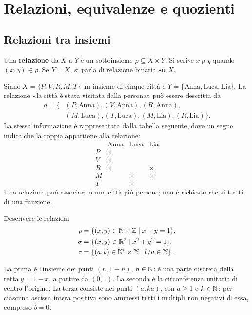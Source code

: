 \chapter{Relazioni, equivalenze e quozienti}

\section{Relazioni tra insiemi}
\begin{definizione}
Una \textbf{relazione} da $X$ a $Y$ è un sottoinsieme $\rho\subseteq X\times Y$. Si scrive $x\mathrel\rho y$ quando $(x,y)\in\rho$. Se $Y=X$, si parla di relazione binaria \textbf{su} $X$.
\end{definizione}

\begin{esempio}
Siano $X=\{P,V,R,M,T\}$ un insieme di cinque città e $Y=\{\text{Anna},\text{Luca},\text{Lia}\}$. La relazione «la città è stata visitata dalla persona» può essere descritta da
\[
\begin{split}
\rho=\{&(P,\text{Anna}),(V,\text{Anna}),(R,\text{Anna}),\\
       &(M,\text{Luca}),(T,\text{Luca}),(M,\text{Lia}),(R,\text{Lia})\}.
\end{split}
\]
La stessa informazione è rappresentata dalla tabella seguente, dove un segno indica che la coppia appartiene alla relazione:
\[
\begin{array}{c|ccc}
&\text{Anna}&\text{Luca}&\text{Lia}\\\hline
P&\times&&\\V&\times&&\\R&\times&&\times\\M&&\times&\times\\T&&\times&
\end{array}
\]
Una relazione può associare a una città più persone; non è richiesto che si tratti di una funzione.
\end{esempio}

\begin{esercizio}
Descrivere le relazioni
\[
\begin{aligned}
\rho&=\{(x,y)\in\mathbb{N}\times\mathbb{Z}\mid x+y=1\},\\
\sigma&=\{(x,y)\in\mathbb{R}^2\mid x^2+y^2=1\},\\
\tau&=\{(a,b)\in\mathbb{N}^*\times\mathbb{N}\mid b/a\in\mathbb{N}\}.
\end{aligned}
\]
\end{esercizio}
\begin{svolgimento}
La prima è l'insieme dei punti $(n,1-n)$, $n\in\mathbb{N}$: è una parte discreta della retta $y=1-x$, a partire da $(0,1)$. La seconda è la circonferenza unitaria di centro l'origine. La terza consiste nei punti $(a,ka)$, con $a\ge1$ e $k\in\mathbb{N}$: per ciascuna ascissa intera positiva sono ammessi tutti i multipli non negativi di essa, compreso $b=0$.
\end{svolgimento}

